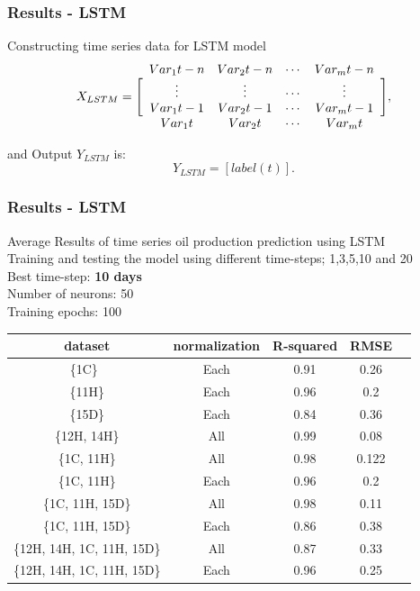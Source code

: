 \documentclass[xcolor=table]{beamer}
\begin{document}
\begin{frame}
\frametitle{Results - LSTM}

\begin{block}{Constructing time series data for LSTM model}
\begin{equation}
X_{LSTM} =	\Bigg[\begin{array}{c c c c}
Var_1{t-n} & Var_2{t-n} & \cdots & Var_m{t-n}\\
\vdots & \vdots & \cdots & \vdots \\
Var_1{t-1} & Var_2{t-1} & \cdots & Var_m{t-1}\\
Var_1{t} & Var_2{t}& \cdots & Var_m{t}\\
\end{array}\Bigg],
\end{equation}

and Output $Y_{LSTM}$ is:
\begin{equation}
Y_{LSTM} = [label(t)].	
\end{equation}

\end{block}

\end{frame}

\begin{frame}
\frametitle{Results - LSTM}
 \begin{block}{}
Average Results of time series oil production prediction using LSTM\\
Training and testing the model using different time-steps; 1,3,5,10 and 20\\
Best time-step: \textbf{10 days}\\
Number of neurons: 50\\
Training epochs: 100
\end{block}

 \begin{table}[H]
 \begin{adjustbox}{width=0.8\linewidth,center}
 
 		\begin{tabular}{ccccc}
 			\toprule
 			\multicolumn{1}{c}{dataset}&\multicolumn{1}{c}{normalization}&\multicolumn{1}{c}{R-squared}&\multicolumn{1}{c}{RMSE}\tabularnewline
 			\midrule
 			\{1C\}\ & Each &  0.91 & 0.26 \tabularnewline
			\{11H\} & Each &  0.96 & 0.2 \tabularnewline
			\{15D\} & Each &  0.84 & 0.36\tabularnewline
			\{12H, 14H\} & All &\cellcolor{green!40}0.99 & 0.08 \tabularnewline
			\{1C, 11H\} & All &\cellcolor{green!40} 0.98 & 0.122\tabularnewline
			\{1C, 11H\} & Each & 0.96 & 0.2\tabularnewline
			\{1C, 11H, 15D\} & All &\cellcolor{green!40} 0.98 & 0.11\tabularnewline
			\{1C, 11H, 15D\}  & Each &  0.86 & 0.38 \tabularnewline
			\{12H, 14H, 1C, 11H, 15D\}& All &  0.87 & 0.33\tabularnewline
			\{12H, 14H, 1C, 11H, 15D\} & Each &  0.96 & 0.25\tabularnewline 			
			\bottomrule
 	\end{tabular}
	\end{adjustbox}
 \end{table}
 
\end{frame}
\end{document}
